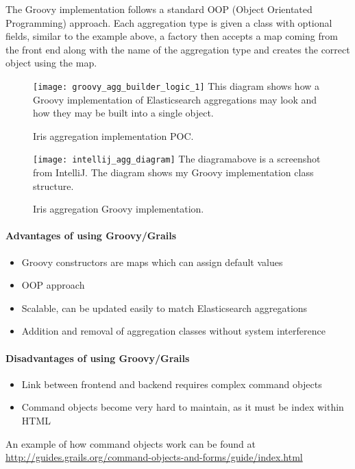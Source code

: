 \documentclass[12pt,a4paper,titlepage]{report}
\begin{document}
\pagebreak
The Groovy implementation follows a standard OOP (Object Orientated Programming) approach. Each aggregation type is given a class with optional fields, similar to the example above, a factory then accepts a map coming from the front end along with the name of the aggregation type and creates the correct object using the map.
\begin{figure}[H]
\begin{tcolorbox}
\texttt{[image: groovy\_agg\_builder\_logic\_1]}
This diagram shows how a Groovy implementation of Elasticsearch aggregations may look and how they may be built into a single object.
\end{tcolorbox}
\caption{Iris aggregation implementation POC.}
\end{figure}
\begin{figure}[H]
\begin{tcolorbox}
\texttt{[image: intellij\_agg\_diagram]}
The diagram\footnotemark above is a screenshot from IntelliJ. The diagram shows my Groovy implementation class structure.
\end{tcolorbox}
\caption{Iris aggregation Groovy implementation.}
\end{figure}

\paragraph{Advantages of using Groovy/Grails}

\begin{itemize}
  \item Groovy constructors are maps which can assign default values
  \item OOP approach
  \item Scalable, can be updated easily to match Elasticsearch aggregations
  \item Addition and removal of aggregation classes without system interference
\end{itemize}

\paragraph{Disadvantages of using Groovy/Grails}

\begin{itemize}
  \item Link between frontend and backend requires complex command objects
  \item Command objects become very hard to maintain, as it must be index within HTML
\end{itemize}
An example of how command objects work can be found at
\newline
\url{http://guides.grails.org/command-objects-and-forms/guide/index.html}
\end{document}

